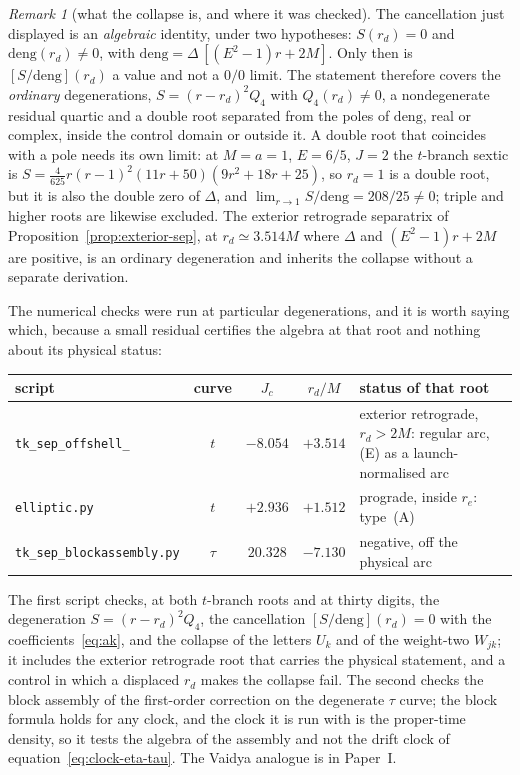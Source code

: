 \documentclass[12pt]{iopart}
\theoremstyle{plain}
\theoremstyle{definition}
\theoremstyle{remark}
\newtheorem{remark}[proposition]{Remark}
\newcommand{\re}{r_{e}}
\newcommand{\Jc}{J_{c}}
\begin{document}
\begin{remark}[what the collapse is, and where it was checked]
\label{rmk:collapse-scope}
The cancellation just displayed is an \emph{algebraic} identity, under two hypotheses:
$S(r_d)=0$ and $\mathrm{deng}(r_d)\neq0$, with $\mathrm{deng}=\Delta\,[(E^2-1)r+2M]$.
Only then is $[S/\mathrm{deng}](r_d)$ a value and not a $0/0$ limit. The statement
therefore covers the \emph{ordinary} degenerations, $S=(r-r_d)^2Q_4$ with
$Q_4(r_d)\neq0$, a nondegenerate residual quartic and a double root separated from the
poles of $\mathrm{deng}$, real or complex, inside the control domain or outside it. A
double root that coincides with a pole needs its own limit: at $M=a=1$, $E=6/5$, $J=2$ the
$t$-branch sextic is $S=\tfrac{4}{625}r(r-1)^2(11r+50)(9r^2+18r+25)$, so $r_d=1$ is a
double root, but it is also the double zero of $\Delta$, and
$\lim_{r\to1}S/\mathrm{deng}=208/25\neq0$; triple and higher roots are likewise excluded.
The exterior retrograde separatrix of Proposition~\ref{prop:exterior-sep}, at
$r_d\simeq3.514M$ where $\Delta$ and $(E^2-1)r+2M$ are positive, is an ordinary
degeneration and inherits the collapse without a separate derivation.

The numerical checks were run at particular degenerations, and it is worth
saying which, because a small residual certifies the algebra at that root and
nothing about its physical status:
\begin{center}
{\small
\begin{tabular}{@{}lccc>{\raggedright\arraybackslash}p{}@{}}
\hline
script & curve & $\Jc$ & $r_d/M$ & status of that root\\
\hline
\texttt{tk\_sep\_offshell\_} & $t$ & $-8.054$ & $+3.514$
  & exterior retrograde, $r_d>2M$: regular arc, (E) as a launch-normalised arc\\
\quad\texttt{elliptic.py} & $t$ & $+2.936$ & $+1.512$
  & prograde, inside $\re$: type~(A)\\
\texttt{tk\_sep\_blockassembly.py} & $\tau$ & $20.328$ & $-7.130$
  & negative, off the physical arc\\
\hline
\end{tabular}}
\end{center}
The first script checks, at both $t$-branch roots and at thirty digits, the
degeneration $S=(r-r_d)^2Q_4$, the cancellation $[S/\mathrm{deng}](r_d)=0$ with the
coefficients~\eqref{eq:ak}, and the collapse of the letters $U_k$ and of the
weight-two $W_{jk}$; it includes the exterior retrograde root that carries the
physical statement, and a control in which a displaced $r_d$ makes the collapse
fail. The second checks the block assembly of the first-order correction on the
degenerate $\tau$ curve; the block formula holds for any clock, and the clock it
is run with is the proper-time density, so it tests the algebra of the assembly
and not the drift clock of equation~\eqref{eq:clock-eta-tau}. The Vaidya analogue
is in Paper~I.
\end{remark}
\end{document}

